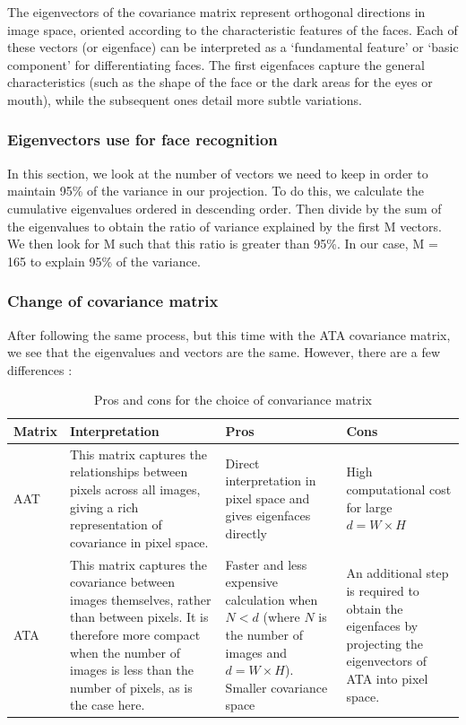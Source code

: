 The eigenvectors of the covariance matrix represent orthogonal directions in image space, oriented according to the characteristic features of the faces. Each of these vectors (or eigenface) can be interpreted as a ‘fundamental feature’ or ‘basic component’ for differentiating faces. The first eigenfaces capture the general characteristics (such as the shape of the face or the dark areas for the eyes or mouth), while the subsequent ones detail more subtle variations.

\subsubsection{Eigenvectors use for face recognition}

In this section, we look at the number of vectors we need to keep in order to maintain 95\% of the variance in our projection. To do this, we calculate the cumulative eigenvalues ordered in descending order. Then divide by the sum of the eigenvalues to obtain the ratio of variance explained by the first M vectors. We then look for M such that this ratio is greater than 95\%. In our case, M = 165 to explain 95\% of the variance.

\subsubsection{Change of covariance matrix}

After following the same process, but this time with the ATA covariance matrix, we see that the eigenvalues and vectors are the same. However, there are a few differences :


\begin{table}[ht]
	\centering
	\begin{tabular}{|l|p{7cm}|p{3cm}|p{3cm}|}
		\hline
		\textbf{Matrix} & \textbf{Interpretation} & \textbf{Pros} & \textbf{Cons} \\
		\hline
		AAT & This matrix captures the relationships between pixels across all images, giving a rich representation of covariance in pixel space. & Direct interpretation in pixel space and gives eigenfaces directly & High computational cost for large \( d = W \times H \) \\
		\hline
		ATA & This matrix captures the covariance between images themselves, rather than between pixels. It is therefore more compact when the number of images is less than the number of pixels, as is the case here. & Faster and less expensive calculation when \( N < d \) (where \( N \) is the number of images and \( d = W \times H \)). Smaller covariance space & An additional step is required to obtain the eigenfaces by projecting the eigenvectors of ATA into pixel space. \\
		\hline
	\end{tabular}
	\caption{Pros and cons for the choice of convariance matrix}
	\label{table:matrix_interpretation}
\end{table}


